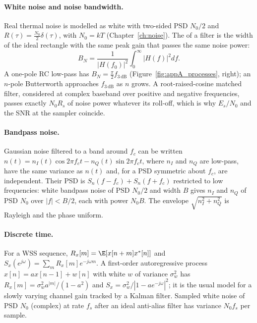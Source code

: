 \paragraph{White noise and noise bandwidth.} Real thermal noise is modelled as white with
two-sided PSD $N_0/2$ and $R(\tau)=\tfrac{N_0}2\delta(\tau)$, with $N_0=kT$
(Chapter~\ref{ch:noise}). The  of a filter is the width of the
ideal rectangle with the same peak gain that passes the same noise power:
\begin{equation}
B_N=\frac{1}{|H(f_0)|^2}\int_0^\infty|H(f)|^2df .
\label{eq:appA:enbw}
\end{equation}
A one-pole RC low-pass has $B_N=\tfrac\pi2f_{3\,\mathrm{dB}}$ (Figure~\ref{fig:appA_processes},
right); an $n$-pole Butterworth approaches $f_{3\,\mathrm{dB}}$ as $n$ grows. A root-raised-cosine
matched filter, considered at complex baseband over positive and negative frequencies, passes
exactly $N_0R_s$ of noise power whatever its roll-off, which is why $E_s/N_0$ and the SNR at the
sampler coincide.


\paragraph{Bandpass noise.} Gaussian noise filtered to a band around $f_c$ can be written
$n(t)=n_I(t)\cos2\pi f_ct-n_Q(t)\sin2\pi f_ct$, where $n_I$ and $n_Q$ are low-pass, have the same
variance as $n(t)$ and, for a PSD symmetric about $f_c$, are independent. Their PSD is
$S_n(f-f_c)+S_n(f+f_c)$ restricted to low frequencies: white bandpass noise of PSD $N_0/2$ and
width $B$ gives $n_I$ and $n_Q$ of PSD $N_0$ over $|f|<B/2$, each with power $N_0B$. The envelope
$\sqrt{n_I^2+n_Q^2}$ is Rayleigh and the phase uniform.

\paragraph{Discrete time.} For a WSS sequence, $R_x[m]=\E[x[n+m]x^*[n]]$ and
$S_x(e^{j\omega})=\sum_mR_x[m]e^{-j\omega m}$. A first-order autoregressive process
$x[n]=ax[n-1]+w[n]$ with white $w$ of variance $\sigma_w^2$ has $R_x[m]=\sigma_w^2a^{|m|}/(1-a^2)$
and $S_x=\sigma_w^2/|1-ae^{-j\omega}|^2$; it is the usual model for a slowly varying channel
gain tracked by a Kalman filter. Sampled white noise of PSD $N_0$ (complex) at rate $f_s$ after an
ideal anti-alias filter has variance $N_0f_s$ per sample.


